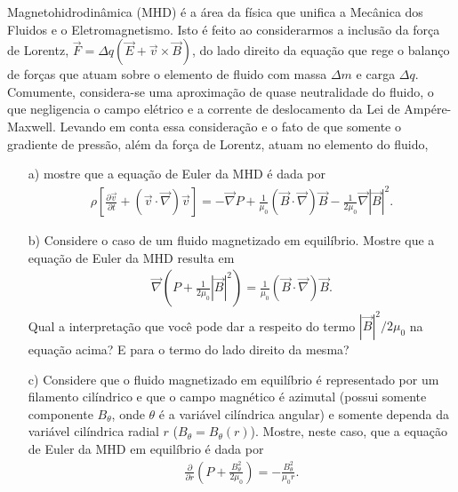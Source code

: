 \documentclass[a4paper,12pt]{article}
\begin{document}
\newpage
{}

\indent \par Magnetohidrodinâmica (MHD) é a área da física que unifica a Mecânica dos Fluidos e o Eletromagnetismo. Isto é feito ao considerarmos a inclusão da força de Lorentz, $\vec{F}=\Delta q (\vec{E} + \vec{v} \times \vec{B})$, do lado direito da equação que rege o balanço de forças que atuam sobre o elemento de fluido com massa $\Delta m$ e carga $\Delta q$. Comumente, considera-se uma aproximação de quase neutralidade do fluido, o que negligencia o campo elétrico e a corrente de deslocamento da Lei de Ampére-Maxwell. Levando em conta essa consideração e o fato de que somente o gradiente de pressão, além da força de Lorentz, atuam no elemento do fluido, 
%
\begin{itemize}
 \item[a)] mostre que a equação de Euler da MHD é dada por
 \begin{eqnarray}
\nonumber
\rho \left[ \frac{\partial \vec{v}}{\partial t} + (\vec{v}\cdot \vec{\nabla})\vec{v} \right]= -\vec{\nabla}P + \frac{1}{\mu_{0}}(\vec{B}\cdot \vec{\nabla})\vec{B} - \frac{1}{2\mu_{0}}\vec{\nabla}|\vec{B}|^{2}.
\end{eqnarray}
 \item[b)] Considere o caso de um fluido magnetizado em equilíbrio. Mostre que a equação de Euler da MHD resulta em
 \begin{eqnarray}
\nonumber
\vec{\nabla}\left(P + \frac{1}{2\mu_{0}}|\vec{B}|^{2}\right) = \frac{1}{\mu_{0}}\left(\vec{B}\cdot \vec{\nabla}\right)\vec{B}.
\end{eqnarray}
%
\noindent Qual a interpretação que você pode dar a respeito do termo $|\vec{B}|^{2}/2\mu_{0}$ na equação acima? E para o termo do lado direito da mesma?
%
\item[c)] Considere que o fluido magnetizado em equilíbrio é representado por um filamento cilíndrico e que o campo magnético é azimutal (possui somente componente $B_{\theta}$, onde $\theta$ é a variável cilíndrica angular) e somente dependa da variável cilíndrica radial $r$ ($B_{\theta}=B_{\theta}(r)$). Mostre, neste caso, que a equação de Euler da MHD em equilíbrio é dada por
%
 \begin{eqnarray}
\nonumber
\frac{\partial}{\partial r} \left( P + \frac{B_{\theta}^{2}}{2\mu_0} \right) = - \frac{B_{\theta}^{2}}{\mu_0 r}.
\end{eqnarray}
%
\end{itemize}
%
%
\end{document}
